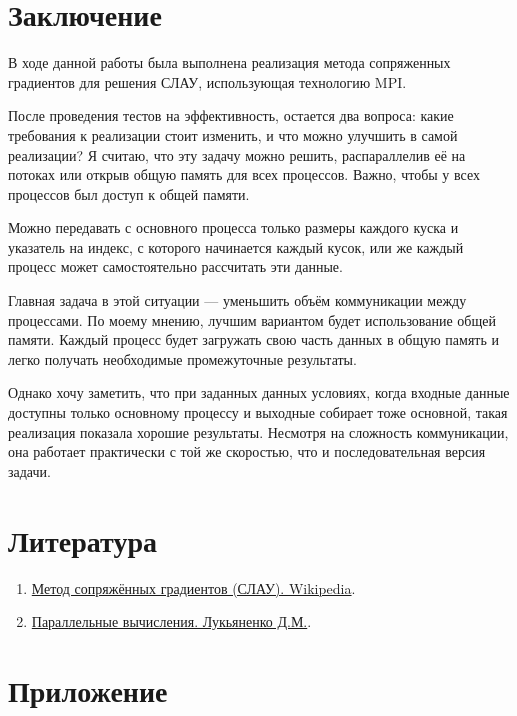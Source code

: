 \documentclass[12pt]{article}
\begin{document}
\section{Заключение}

\hspace*{1.25em}В ходе данной работы была выполнена реализация метода сопряженных градиентов для решения СЛАУ, использующая технологию MPI. 

После проведения тестов на эффективность, остается два вопроса: какие требования к реализации стоит изменить, и что можно улучшить в самой реализации? Я считаю, что эту задачу можно решить, распараллелив её на потоках или открыв общую память для всех процессов. Важно, чтобы у всех процессов был доступ к общей памяти.

Можно передавать с основного процесса только размеры каждого куска и указатель на индекс, с которого начинается каждый кусок, или же каждый процесс может самостоятельно рассчитать эти данные.

Главная задача в этой ситуации — уменьшить объём коммуникации между процессами. По моему мнению, лучшим вариантом будет использование общей памяти. Каждый процесс будет загружать свою часть данных в общую память и легко получать необходимые промежуточные результаты.

Однако хочу заметить, что при заданных данных условиях, когда входные данные доступны только основному процессу и выходные собирает тоже основной, такая реализация показала хорошие результаты. Несмотря на сложность коммуникации, она работает практически с той же скоростью, что и последовательная версия задачи.


\section*{Литература}

\begin{enumerate}
    \item \href{https://ru.wikipedia.org/wiki/Метод_сопряжённых_градиентов_(СЛАУ)}{Метод сопряжённых градиентов (СЛАУ). Wikipedia}.
    \item \href{https://teach-in.ru/lecture/2022-01-14-Lukyanenko}{Параллельные вычисления. Лукьяненко Д.М.}.
\end{enumerate}

\appendix
\section*{Приложение}
\end{document}
